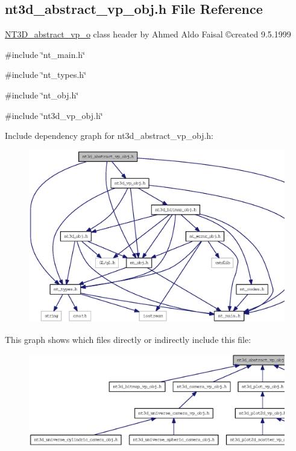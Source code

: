 \subsection{nt3d\_\-abstract\_\-vp\_\-obj.h File Reference}
\label{nt3d__abstract__vp__obj_8h}



\begin{DoxyItemize}
\item \hyperlink{class_n_t3_d__abstract__vp__o}{NT3D\_\-abstract\_\-vp\_\-o} class header by Ahmed Aldo Faisal \copyright created 9.5.1999 
\end{DoxyItemize} 


{\ttfamily \#include \char`\"{}nt\_\-main.h\char`\"{}}\par
{\ttfamily \#include \char`\"{}nt\_\-types.h\char`\"{}}\par
{\ttfamily \#include \char`\"{}nt\_\-obj.h\char`\"{}}\par
{\ttfamily \#include \char`\"{}nt3d\_\-vp\_\-obj.h\char`\"{}}\par
Include dependency graph for nt3d\_\-abstract\_\-vp\_\-obj.h:
\nopagebreak
\begin{figure}[H]
\begin{center}
\leavevmode
\includegraphics[width=400pt]{nt3d__abstract__vp__obj_8h__incl}
\end{center}
\end{figure}
This graph shows which files directly or indirectly include this file:
\nopagebreak
\begin{figure}[H]
\begin{center}
\leavevmode
\includegraphics[width=400pt]{nt3d__abstract__vp__obj_8h__dep__incl}
\end{center}
\end{figure}
